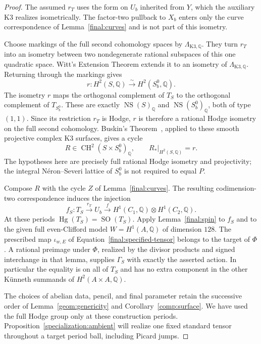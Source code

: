 \documentclass[11pt]{amsart}
\newcommand{\Q}{\mathbb Q}
\DeclareMathOperator{\NS}{NS}
\DeclareMathOperator{\CH}{CH}
\DeclareMathOperator{\Hg}{Hg}
\DeclareMathOperator{\SO}{SO}
\theoremstyle{definition}
\theoremstyle{remark}
\numberwithin{equation}{section}
\begin{document}
\begin{proof}
The assumed $r_T$ uses the form on $U_b$ inherited from $Y$, which
the auxiliary K3 realizes isometrically.  The factor-two pullback to
$X_b$ enters only the curve correspondence of Lemma~\ref{final:curves}
and is not part of this isometry.

Choose markings of the full second cohomology spaces by
$\Lambda_{\mathrm{K3},\Q}$.  They turn $r_T$ into an isometry
between two nondegenerate rational subspaces of this one quadratic
space.  Witt's Extension Theorem
\cite[Corollary~7.2.8]{PetersSterk} extends it to an
isometry of $\Lambda_{\mathrm{K3},\Q}$.  Returning through the
markings gives
\[
 r:H^2(S,\Q)\xrightarrow{\sim}H^2(S_b^0,\Q).
\]
The isometry $r$ maps the orthogonal complement of $T_S$ to
the orthogonal complement of $T_{S_b^0}$.  These are exactly
$\NS(S)_\Q$ and $\NS(S_b^0)_\Q$, both of type $(1,1)$.
Since its restriction $r_T$ is Hodge, $r$ is therefore a rational
Hodge isometry on the full second cohomology.  Buskin's
Theorem~\cite[Theorem~1.1]{Buskin}, applied to these smooth projective
complex K3 surfaces, gives a cycle
\[
 R\in\CH^2(S\times S_b^0)_\Q,\qquad
 R_*|_{H^2(S,\Q)}=r.
\]
The hypotheses here are precisely full rational Hodge isometry and
projectivity; the integral N\'eron--Severi lattice of $S_b^0$ is not
required to equal $P$.

Compose $R$ with the cycle $Z$ of Lemma~\ref{final:curves}.
The resulting codimension-two correspondence induces the injection
\[
 f_S:T_S\xrightarrow{r_T}U_b
       \xrightarrow{f}H^1(C_1,\Q)\otimes H^1(C_2,\Q).
\]
At these periods $\Hg(T_S)=\SO(T_S)$.  Apply
Lemma~\ref{final:spin} to $f_S$ and to the given full
even-Clifford model $W=H^1(A,\Q)$ of dimension $128$.
The prescribed map $\iota_{w,E}$ of
Equation~\eqref{final:specified-tensor} belongs to the target of
$\Phi$.  A rational preimage under $\Phi$, realized by the divisor
products and signed interchange in that lemma, supplies $\Gamma_S$
with exactly the asserted action.  In particular the equality is
on all of $T_S$ and has no extra component in the other
K\"unneth summands of $H^2(A\times A,\Q)$.

The choices of abelian data, pencil, and final parameter retain the
successive order of Lemma~\ref{geom:genericity} and
Corollary~\ref{comp:surface}.  We have used the full Hodge group only
at these construction periods.  Proposition~\ref{specialization:ambient}
will realize one fixed standard tensor throughout a target period
ball, including Picard jumps.
\end{proof}
\end{document}
